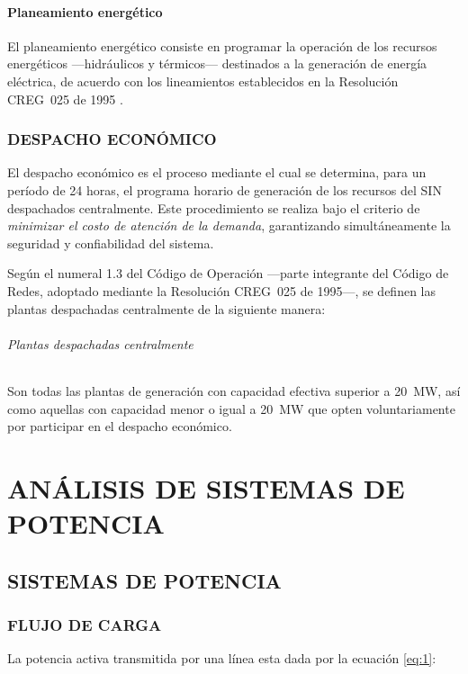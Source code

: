 \documentclass[a5paper]{book}%
\begin{document}
\subsection{Planeamiento energético}

El planeamiento energético consiste en programar la operación de los recursos energéticos —hidráulicos y térmicos— destinados a la generación de energía eléctrica, de acuerdo con los lineamientos establecidos en la Resolución CREG~025 de 1995 \cite{CREG0251995}.

\section{DESPACHO ECONÓMICO}

El despacho económico es el proceso mediante el cual se determina, para un período de 24 horas, el programa horario de generación de los recursos del \ac{SIN} despachados centralmente.  
Este procedimiento se realiza bajo el criterio de \textit{minimizar el costo de atención de la demanda}, garantizando simultáneamente la seguridad y confiabilidad del sistema.

Según el numeral 1.3 del Código de Operación —parte integrante del Código de Redes, adoptado mediante la Resolución CREG~025 de 1995—, se definen las plantas despachadas centralmente de la siguiente manera:

\paragraph{Plantas despachadas centralmente}

Son todas las plantas de generación con capacidad efectiva superior a 20~MW, así como aquellas con capacidad menor o igual a 20~MW que opten voluntariamente por participar en el despacho económico.

\part{ANÁLISIS DE SISTEMAS DE POTENCIA}

\chapter{SISTEMAS DE  POTENCIA}

\section{FLUJO DE CARGA}
La potencia activa transmitida por una línea esta dada por la ecuación \ref{eq:1}:
\end{document}

